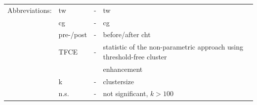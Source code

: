 \documentclass{article}
\begin{document}
\begin{table}[ht]
{        \vspace{-6pt}
        \setlength{\tabcolsep}{4pt}
            \begin{tabular}{llll}
                \hspace{-6pt} Abbreviations: & \ac{tw}   & - & \acl{tw}                                                              \\
                & \acs{cg}  & - & \acl{cg}                                                              \\
                & pre-/post & - & before/after \acl{cht}                                                \\
                & TFCE      & - & statistic of the non-parametric approach using threshold-free cluster \\
                &           &   & enhancement                                                           \\
                & k         & - & clustersize                                                           \\
                & n.s.      & - & not significant, $k > 100$                                            \\
            \end{tabular}
        }
        \label{tab:roi_analysis_restricted_tw_sample}
    \end{table}
\end{document}
